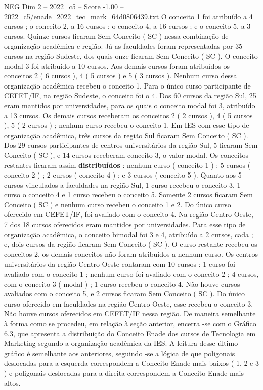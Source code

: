 \begin{textsample}{NEG Dim 2 – 2022\_c5 – Score -1.00 – 2022\_c5/enade\_2022\_tec\_mark\_64d0806439.txt}
O conceito 1 foi atribuído a 4 cursos ; o conceito 2, a 16 cursos ; o conceito 4, a 16 cursos ; e o conceito 5, a 3 cursos.
Quinze cursos ficaram Sem Conceito ( SC ) nessa combinação de organização acadêmica e região.
Já as faculdades foram representadas por 35 cursos na região Sudeste, dos quais onze ficaram Sem Conceito ( SC ).
O conceito modal 3 foi atribuído a 10 cursos.
Aos demais cursos foram atribuídos os conceitos 2 ( 6 cursos ), 4 ( 5 cursos ) e 5 ( 3 cursos ).
Nenhum curso dessa organização acadêmica recebeu o conceito 1.
Para o único curso participante de CEFET/IF, na região Sudeste, o conceito foi o 4.
Dos 60 cursos da região Sul, 25 eram mantidos por universidades, para os quais o conceito modal foi 3, atribuído a 13 cursos.
Os demais cursos receberam os conceitos 2 ( 2 cursos ), 4 ( 5 cursos ), 5 ( 2 cursos ) ; nenhum curso recebeu o conceito 1.
Em IES com esse tipo de organização acadêmica, três cursos da região Sul ficaram Sem Conceito ( SC ).
Dos 29 cursos participantes de centros universitários da região Sul, 5 ficaram Sem Conceito ( SC ), e 14 cursos receberam conceito 3, o valor modal.
Os conceitos restantes ficaram assim \textbf{distribuídos} : nenhum curso ( conceito 1 ) ; 5 cursos ( conceito 2 ) ; 2 cursos ( conceito 4 ) ; e 3 cursos ( conceito 5 ).
Quanto aos 5 cursos vinculados a faculdades na região Sul, 1 curso recebeu o conceito 3, 1 curso o conceito 4 e 1 curso recebeu o conceito 5.
Somente 2 cursos ficaram Sem Conceito ( SC ) e nenhum curso recebeu o conceito 1 e 2.
Do único curso oferecido em CEFET/IF, foi avaliado com o conceito 4.
Na região Centro-Oeste, 7 dos 18 cursos oferecidos eram mantidos por universidades.
Para esse tipo de organização acadêmica, o conceito bimodal foi 3 e 4, atribuído a 2 cursos, cada ; e, dois cursos da região ficaram Sem Conceito ( SC ).
O curso restante recebeu os conceitos 2, os demais conceitos não foram atribuídos a nenhum curso.
Os centros universitários da região Centro-Oeste contaram com 10 cursos : 1 curso foi avaliado com o conceito 1 ; nenhum curso foi avaliado com o conceito 2 ; 4 cursos, com o conceito 3 ( modal ) ; 1 curso recebeu o conceito 4.
Não houve cursos avaliados com o conceito 5, e 2 cursos ficaram Sem Conceito ( SC ).
Do único curso oferecido em faculdades na região Centro-Oeste, esse recebeu o conceito 3.
Não houve cursos oferecidos em CEFET/IF nessa região.
De maneira semelhante à forma como se procedeu, em relação à seção anterior, encerra -se com o Gráfico 6.3, que apresenta a distribuição do Conceito Enade dos cursos de Tecnologia em Marketing segundo a organização acadêmica da IES.
A leitura desse último gráfico é semelhante aos anteriores, seguindo -se a lógica de que poligonais deslocadas para a esquerda correspondem a Conceito Enade mais baixos ( 1, 2 e 3 ) e poligonais deslocadas para a direita correspondem a Conceito Enade mais altos.

\end{textsample}
